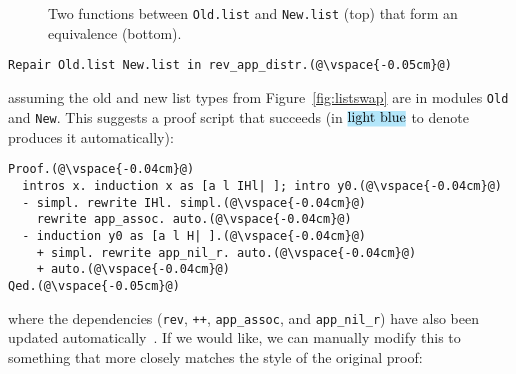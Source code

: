 \iffalse
\begin{figure*}
\begin{minipage}{0.46\textwidth}
   
\end{minipage}
\hfill
\begin{minipage}{0.46\textwidth}
   
\end{minipage}
\vspace{-0.4cm}
\caption{The updated \lstinline{list} (right) is the old \lstinline{list} (left) with its two constructors swapped (\codediff{orange}).}
\label{fig:listswap}
\end{figure*}
\fi

\begin{figure*}
\vspace{-0.3cm}
\caption{Two functions between \lstinline{Old.list} and \lstinline{New.list} (top) that form an equivalence (bottom).}
\label{fig:equivalence}
\end{figure*}

\begin{lstlisting}
Repair Old.list New.list in rev_app_distr.(@\vspace{-0.05cm}@)
\end{lstlisting}
assuming the old and new list types from Figure~\ref{fig:listswap} are in modules \lstinline{Old} and \lstinline{New}.
This suggests a proof script that succeeds (in $\codeauto{light blue}$ to denote \toolname produces it automatically):

\begin{lstlisting}[backgroundcolor=\color{cyan!30}]
Proof.(@\vspace{-0.04cm}@)
  intros x. induction x as [a l IHl| ]; intro y0.(@\vspace{-0.04cm}@)
  - simpl. rewrite IHl. simpl.(@\vspace{-0.04cm}@)
    rewrite app_assoc. auto.(@\vspace{-0.04cm}@)
  - induction y0 as [a l H| ].(@\vspace{-0.04cm}@)
    + simpl. rewrite app_nil_r. auto.(@\vspace{-0.04cm}@)
    + auto.(@\vspace{-0.04cm}@)
Qed.(@\vspace{-0.05cm}@)
\end{lstlisting}
where the dependencies (\lstinline{rev}, \lstinline{++}, \lstinline{app_assoc}, and \lstinline{app_nil_r}) have
also been updated automatically~. %
If we would like, we can manually modify this to something that more closely matches the style of the original proof:

